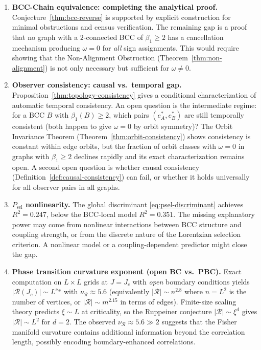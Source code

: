 \documentclass[11pt]{article}
\theoremstyle{definition}
\theoremstyle{remark}
\newcommand{\vort}{\omega}
\newcommand{\betti}{\beta_1}
\newcommand{\Scal}{\mathcal{R}}
\begin{document}
\begin{enumerate}
\item \textbf{BCC-Chain equivalence: completing the analytical proof.}
  Conjecture~\ref{thm:bcc-reverse} is supported by explicit construction for
  minimal obstructions and census verification. The remaining gap is a
  proof that no graph with a $2$-connected BCC of $\betti \geq 2$ has
  a cancellation mechanism producing $\vort = 0$ for \emph{all} sign
  assignments. This would require showing that the Non-Alignment
  Obstruction (Theorem~\ref{thm:non-alignment}) is not only necessary
  but sufficient for $\vort \neq 0$.

\item \textbf{Observer consistency: causal vs.\ temporal gap.}
  Proposition~\ref{thm:topology-consistency} gives a conditional
  characterization of automatic
  temporal consistency.  An open question is the intermediate regime:
  for a BCC $B$ with $\betti(B) \geq 2$, which pairs $(e^*_A, e^*_B)$
  are still temporally consistent (both happen to give $\vort = 0$ by
  orbit symmetry)?  The Orbit Invariance Theorem
  (Theorem~\ref{thm:orbit-consistency}) shows consistency is constant
  within edge orbits, but the fraction of orbit classes with $\vort = 0$
  in graphs with $\betti \geq 2$ declines rapidly and its exact
  characterization remains open.  A second open question is whether
  causal consistency (Definition~\ref{def:causal-consistency}) can fail,
  or whether it holds universally for all observer pairs in all graphs.

\item \textbf{$P_{\mathrm{sel}}$ nonlinearity.} The global discriminant
  \eqref{eq:psel-discriminant} achieves $R^2 = 0.247$, below the
  BCC-local model $R^2 = 0.351$. The missing explanatory power may
  come from nonlinear interactions between BCC structure and coupling
  strength, or from the discrete nature of the Lorentzian selection
  criterion. A nonlinear model or a coupling-dependent predictor might
  close the gap.

\item \textbf{Phase transition curvature exponent (open BC vs.\ PBC).}
  Exact computation on $L \times L$ grids at $J = J_c$ with \emph{open}
  boundary conditions yields
  $|\Scal(J_c)| \sim L^{\nu_{\Scal}}$ with $\nu_{\Scal} \approx 5.6$
  (equivalently $|\Scal| \sim n^{2.8}$ where $n = L^2$ is the number of
  vertices, or $|\Scal| \sim m^{2.15}$ in terms of edges). Finite-size
  scaling theory predicts $\xi \sim L$ at criticality, so the Ruppeiner
  conjecture $|\Scal| \sim \xi^d$ gives $|\Scal| \sim L^2$ for $d = 2$.
  The observed $\nu_{\Scal} \approx 5.6 \gg 2$ suggests that the Fisher
  manifold curvature contains additional information beyond the correlation
  length, possibly encoding boundary-enhanced correlations.


\end{enumerate}
\end{document}
